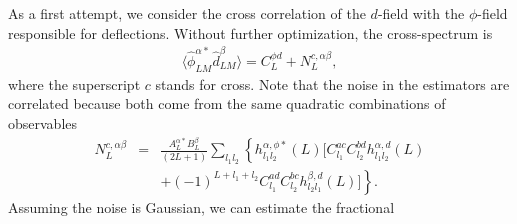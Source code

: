\documentclass[prd,amsmath,amssymb,floatfix,superscriptaddress,nofootinbib,twocolumn]{revtex4-1}
\def\bea{\begin{eqnarray}}
\def\eea{\end{eqnarray}}
\newcommand{\eql}[1]{\label{eq:#1}}
\begin{document}
As a first attempt, we consider the cross correlation of the $d$-field with the $\phi$-field responsible for deflections. Without further optimization, the cross-spectrum is
\bea
 \langle \hat{\phi}^{\alpha*}_{LM}\hat{d}^{\beta}_{LM} \rangle= {C}_{L}^{\phi d} +N_{L}^{c,\alpha\beta},\eql{crossn}
\eea 
where the superscript $c$ stands for cross.  Note that the noise in the estimators are correlated because 
both come from the same quadratic combinations of observables
\bea
N_{L}^{c,\alpha\beta}&=&\frac{A_{L}^{\alpha*}B_{L}^{\beta}}{(2L+1)}\sum_{l_{1}l_{2}}  \left\{ h_{l_{1}l_{2}}^{\alpha,\phi*} (L)\big[ C_{l_{1}}^{ac}C_{l_{2}}^{bd}h_{l_{1}l_{2}}^{\alpha,d}(L)\right. \nonumber \\
&&\left. +(-1)^{L+l_{1}+l_{2}}C_{l_{1}}^{ad}C_{l_{2}}^{bc} h_{l_{2}l_{1}}^{\beta,d}(L)  \big]\right\}.\eql{full} 
\eea
Assuming the noise is Gaussian, we can  estimate the fractional
\end{document}
